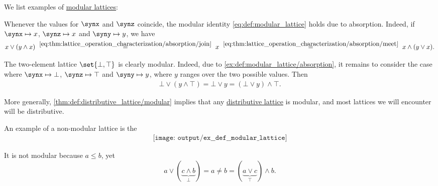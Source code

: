 \begin{example}\label{ex:def:modular_lattice}
  We list examples of \hyperref[def:modular_lattice]{modular lattices}:
  \begin{thmenum}
     Whenever the values for \( \synx \) and \( \synz \) coincide, the modular identity \eqref{eq:def:modular_lattice} holds due to absorption. Indeed, if \( \synx \mapsto x \), \( \synz \mapsto x \) and \( \syny \mapsto y \), we have
    \begin{equation*}
      x \vee (y \wedge x)
      \reloset {\eqref{eq:thm:lattice_operation_characterization/absorption/join}} =
      x
      \reloset {\eqref{eq:thm:lattice_operation_characterization/absorption/meet}} =
      x \wedge (y \vee x).
    \end{equation*}

     The two-element lattice \( \set{ \bot, \top } \) is clearly modular. Indeed, due to \cref{ex:def:modular_lattice/absorption}, it remains to consider the case where \( \synx \mapsto \bot \), \( \synz \mapsto \top \) and \( \syny \mapsto y \), where \( y \) ranges over the two possible values. Then
    \begin{align*}
      \bot \vee (y \wedge \top)
      =
      \bot \vee y
      =
      (\bot \vee y) \wedge \top.
    \end{align*}

    More generally, \cref{thm:def:distributive_lattice/modular} implies that any \hyperref[def:distributive_lattice]{distributive lattice} is modular, and most lattices we will encounter will be distributive.

     An example of a non-modular lattice is the 
    \begin{equation}\label{eq:ex:def:modular_lattice/pentagon}\tag{\( N_5 \)}
      \begin{aligned}
        \texttt{[image: output/ex\_\_def\_\_modular\_lattice]}
      \end{aligned}
    \end{equation}

    It is not modular because \( a \leq b \), yet
    \begin{equation*}
      a \vee (\underbrace{c \wedge b}_{\bot})
      =
      a
      \neq
      b
      =
      (\underbrace{a \vee c}_{\top}) \wedge b.
    \end{equation*}
  \end{thmenum}
\end{example}


